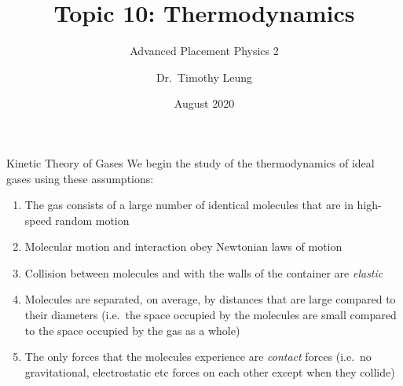 \documentclass[12pt,aspectratio=169]{beamer}
\title{Topic 10: Thermodynamics}
\subtitle{Advanced Placement Physics 2}
\author[TML]{Dr.\ Timothy Leung}
\institute{Olympiads School\\Toronto, ON, Canada}
\date{August 2020}
\begin{document}
\begin{frame}
  \maketitle
\end{frame}



%



\begin{frame}{Kinetic Theory of Gases}
  We begin the study of the thermodynamics of ideal gases using these
  assumptions:
  \begin{enumerate}
  \item The gas consists of a large number of identical molecules that are in
    high-speed random motion
  \item Molecular motion and interaction obey Newtonian laws of motion
  \item Collision between molecules and with the walls of the container are
    \emph{elastic}
  \item Molecules are separated, on average, by distances that are large
    compared to their diameters (i.e.\ the space occupied by the molecules are
    small compared to the space occupied by the gas as a whole)
  \item The only forces that the molecules experience are \emph{contact} forces
    (i.e.\ no gravitational, electrostatic etc forces on each other except when
    they collide)
  \end{enumerate}
\end{frame}
\end{document}
